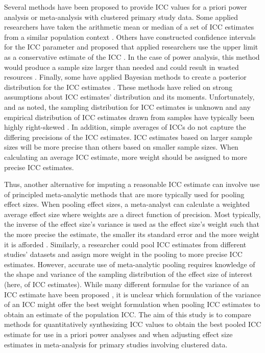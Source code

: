 Several methods have been proposed to provide ICC values for a priori power analysis or meta-analysis with clustered primary study data. Some applied researchers have taken the arithmetic mean or median of a set of ICC estimates from a similar population context \cite{puzioDifferentiatedLiteracyInstruction2020a, grahamEffectsWritingLearning2020}. Others have constructed confidence intervals for the ICC parameter and proposed that applied researchers use the upper limit as a conservative estimate of the ICC \cite{donner1986}. In the case of power analysis, this method would produce a sample size larger than needed and could result in wasted resources \cite{donner1986}. Finally, some have applied Bayesian methods to create a posterior distribution for the ICC estimates \cite{spiegelhalter2001, turnerAllowingImprecisionIntracluster2004, turnerPriorDistributionsIntracluster2005}. These methods have relied on strong assumptions about ICC estimates' distribution and its moments. Unfortunately, and as noted, the sampling distribution for ICC estimates is unknown and any empirical distribution of ICC estimates drawn from samples have typically been highly right-skewed \cite{hedbergReferenceValuesWithinDistrict2014, stockford2009}. In addition, simple averages of ICCs do not capture the differing precisions of the ICC estimates. ICC estimates based on larger sample sizes will be more precise than others based on smaller sample sizes. When calculating an average ICC estimate, more weight should be assigned to more precise ICC estimates. 

Thus, another alternative for imputing a reasonable ICC estimate can involve use of principled meta-analytic methods that are more typically used for pooling effect sizes. When pooling effect sizes, a meta-analyst can calculate a weighted average effect size where weights are a direct function of precision. Most typically, the inverse of the effect size's variance is used as the effect size's weight such that the more precise the estimate, the smaller its standard error and the more weight it is afforded \cite{tanner-smith2014}. Similarly, a researcher could pool ICC estimates from different studies' datasets and assign more weight in the pooling to more precise ICC estimates. However, accurate use of meta-analytic pooling requires knowledge of the shape and variance of the sampling distribution of the effect size of interest (here, of ICC estimates). While many different formulae for the variance of an ICC estimate have been proposed \cite{smith1957, swiger1964,hedgesVarianceIntraclassCorrelations2012,fisherTheoryStatisticalEstimation1925,donner1980, fisher1970statistical}, it is unclear which formulation of the variance of an ICC might offer the best weight formulation when pooling ICC estimates to obtain an estimate of the population ICC. The aim of this study is to compare methods for quantitatively synthesizing ICC values to obtain the best pooled ICC estimate for use in a priori power analyses and when adjusting effect size estimates in meta-analysis for primary studies involving clustered data.

